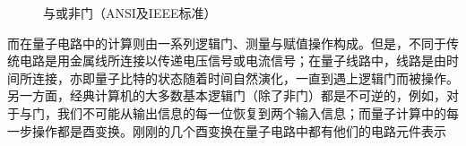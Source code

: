 \documentclass[a4paper,11pt,onecolumn,twoside]{article}
\begin{document}
\begin{figure}[H]
    \centering    %

    \caption{与或非门（ANSI及IEEE标准）} %
    \label{fig:and-or-not-gate}  %
\end{figure}

而在量子电路中的计算则由一系列逻辑门、测量与赋值操作构成。但是，不同于传统电路是用金属线所连接以传递电压信号或电流信号；在量子线路中，线路是由时间所连接，亦即量子比特的状态随着时间自然演化，一直到遇上逻辑门而被操作。另一方面，经典计算机的大多数基本逻辑门（除了非门）都是不可逆的，例如，对于与门，我们不可能从输出信息的每一位恢复到两个输入信息；而量子计算中的每一步操作都是酉变换。刚刚的几个酉变换在量子电路中都有他们的电路元件表示
\end{document}

